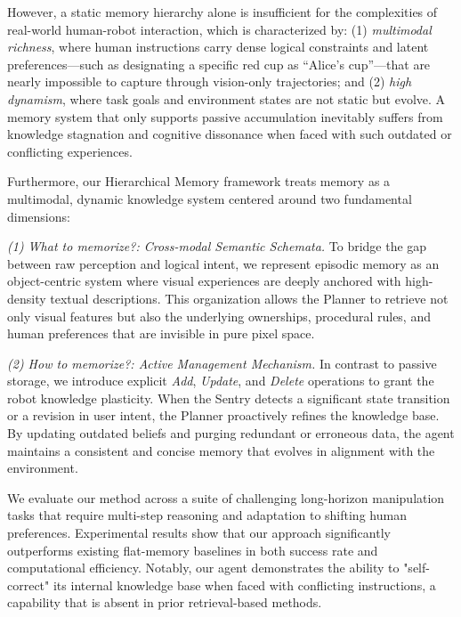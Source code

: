 However, a static memory hierarchy alone is insufficient for the complexities of real-world human-robot interaction, which is characterized by: (1) \textit{multimodal richness}, where human instructions carry dense logical constraints and latent preferences---such as designating a specific red cup as ``Alice's cup''---that are nearly impossible to capture through vision-only trajectories; and (2) \textit{high dynamism}, where task goals and environment states are not static but evolve. A memory system that only supports passive accumulation \cite{memer2025} inevitably suffers from knowledge stagnation and cognitive dissonance when faced with such outdated or conflicting experiences.

Furthermore, our Hierarchical Memory framework treats memory as a multimodal, dynamic knowledge system centered around two fundamental dimensions:

\textit{(1) What to memorize?: Cross-modal Semantic Schemata.} To bridge the gap between raw perception and logical intent, we represent episodic memory as an object-centric system where visual experiences are deeply anchored with high-density textual descriptions. This organization allows the Planner to retrieve not only visual features but also the underlying ownerships, procedural rules, and human preferences that are invisible in pure pixel space.

\textit{(2) How to memorize?: Active Management Mechanism.} In contrast to passive storage, we introduce explicit \textit{Add}, \textit{Update}, and \textit{Delete} operations to grant the robot knowledge plasticity. When the Sentry detects a significant state transition or a revision in user intent, the Planner proactively refines the knowledge base. By updating outdated beliefs and purging redundant or erroneous data, the agent maintains a consistent and concise memory that evolves in alignment with the environment.

We evaluate our method across a suite of challenging long-horizon manipulation tasks that require multi-step reasoning and adaptation to shifting human preferences. Experimental results show that our approach significantly outperforms existing flat-memory baselines in both success rate and computational efficiency. Notably, our agent demonstrates the ability to "self-correct" its internal knowledge base when faced with conflicting instructions, a capability that is absent in prior retrieval-based methods.

